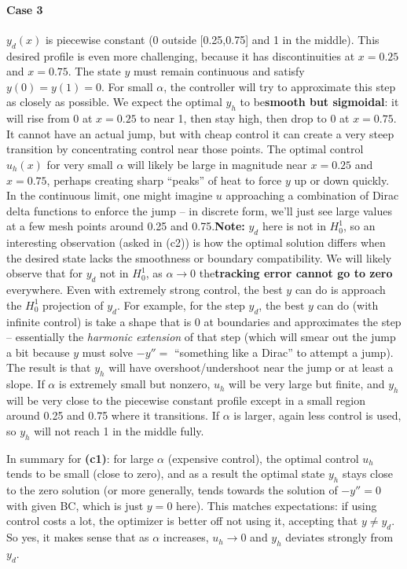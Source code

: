 \documentclass[a4paper,10pt]{article}
\begin{document}
\paragraph{Case 3}
\(y_d(x)\) is piecewise constant (0 outside [0.25,0.75] and 1 in the middle).
This desired profile is even more challenging, because it has discontinuities at \(x=0.25\) and \(x=0.75\). The state \(y\) must remain continuous and satisfy \(y(0)=y(1)=0\). For small \(\alpha\), the controller will try to approximate this step as closely as possible. We expect the optimal \(y_h\) to be\textbf{smooth but sigmoidal}: it will rise from 0 at \(x=0.25\) to near 1, then stay high, then drop to 0 at \(x=0.75\). It cannot have an actual jump, but with cheap control it can create a very steep transition by concentrating control near those points. The optimal control \(u_h(x)\) for very small \(\alpha\) will likely be large in magnitude near \(x=0.25\) and \(x=0.75\), perhaps creating sharp “peaks” of heat to force \(y\) up or down quickly. In the continuous limit, one might imagine \(u\) approaching a combination of Dirac delta functions to enforce the jump – in discrete form, we'll just see large values at a few mesh points around 0.25 and 0.75.\textbf{Note:} \(y_d\) here is not in \(H^1_0\), so an interesting observation (asked in (c2)) is how the optimal solution differs when the desired state lacks the smoothness or boundary compatibility. We will likely observe that for \(y_d\) not in \(H^1_0\), as \(\alpha \to 0\) the\textbf{tracking error cannot go to zero} everywhere. Even with extremely strong control, the best \(y\) can do is approach the \(H^1_0\) projection of \(y_d\). For example, for the step \(y_d\), the best \(y\) can do (with infinite control) is take a shape that is 0 at boundaries and approximates the step – essentially the \emph{harmonic extension} of that step (which will smear out the jump a bit because \(y\) must solve \(-y'' = \) “something like a Dirac” to attempt a jump). The result is that \(y_h\) will have overshoot/undershoot near the jump or at least a slope. If \(\alpha\) is extremely small but nonzero, \(u_h\) will be very large but finite, and \(y_h\) will be very close to the piecewise constant profile except in a small region around 0.25 and 0.75 where it transitions. If \(\alpha\) is larger, again less control is used, so \(y_h\) will not reach 1 in the middle fully.


In summary for \textbf{(c1)}: for large \(\alpha\) (expensive control), the optimal control \(u_h\) tends to be small (close to zero), and as a result the optimal state \(y_h\) stays close to the zero solution (or more generally, tends towards the solution of \(-y''=0\) with given BC, which is just \(y=0\) here). This matches expectations: if using control costs a lot, the optimizer is better off not using it, accepting that \(y \neq y_d\). So yes, it makes sense that as \(\alpha\) increases, \(u_h \to 0\) and \(y_h\) deviates strongly from \(y_d\).
\end{document}
